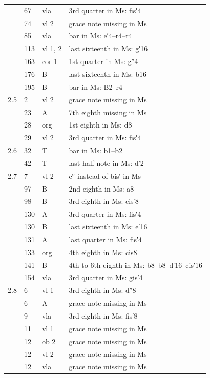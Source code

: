 \documentclass[parskip=full]{scrreprt}
\begin{document}
\begin{longtable}{lll L{10cm}}
	     & 67  & vla     & 3rd quarter in Ms: fis′4 \\
	     & 74  & vl 2    & grace note missing in Ms \\
	     & 85  & vla     & bar in Ms: e′4–r4–r4 \\
	     & 113 & vl 1, 2 & last sixteenth in Ms: g′16 \\
	     & 163 & cor 1   & 1st quarter in Ms: g″4 \\
	     & 176 & B       & last sixteenth in Ms: b16 \\
	     & 195 & B       & bar in Ms: B2–r4 \\
	2.5  & 2   & vl 2    & grace note missing in Ms \\
	     & 23  & A       & 7th eighth missing in Ms \\
	     & 28  & org     & 1st eighth in Ms: d8 \\
	     & 29  & vl 2    & 3rd quarter in Ms: fis′4 \\
	2.6  & 32  & T       & bar in Ms: b1–b2 \\
	     & 42  & T       & last half note in Ms: d′2 \\
	2.7  &  7  & vl 2    & c″ instead of bis′ in Ms \\
	     & 97  & B       & 2nd eighth in Ms: a8 \\
	     & 98  & B       & 3rd eighth in Ms: cis′8 \\
	     & 130 & A       & 3rd quarter in Ms: fis′4 \\
	     & 130 & B       & last sixteenth in Ms: e′16 \\
	     & 131 & A       & last quarter in Ms: fis′4 \\
	     & 133 & org     & 4th eighth in Ms: cis8 \\
	     & 141 & B       & 4th to 6th eighth in Ms: b8–b8–d′16–cis′16 \\
	     & 154 & vla     & 3rd quarter in Ms: gis′4 \\
	2.8  & 6   & vl 1    & 3rd eighth in Ms: d″8 \\
	     & 6   & A       & grace note missing in Ms \\
	     & 9   & vla     & 3rd eighth in Ms: fis′8 \\
	     & 11  & vl 1    & grace note missing in Ms \\
	     & 12  & ob 2    & grace note missing in Ms \\
	     & 12  & vl 2    & grace note missing in Ms \\
	     & 12  & vla     & grace note missing in Ms \\

\end{longtable}
\end{document}
